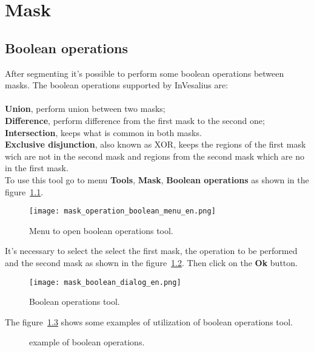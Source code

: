 \chapter{Mask}


\section{Boolean operations}

After segmenting it's possible to perform some boolean operations between masks. The boolean operations supported by InVesalius are:\\
\\
\textbf{Union}, perform union between two masks;\\
\textbf{Difference}, perform difference from the first mask to the second one;\\
\textbf{Intersection}, keeps what is common in both masks.\\
\textbf{Exclusive disjunction}, also known as XOR, keeps the regions of the first mask wich are not in the second mask and regions from the second mask which are no in the first mask.\\

To use this tool go to menu \textbf{Tools}, \textbf{Mask}, \textbf{Boolean operations} as shown in the figure~\ref{fig:booleano_menu}.

\begin{figure}[!htb]
\centering
\texttt{[image: mask\_operation\_boolean\_menu\_en.png]}
\caption{Menu to open boolean operations tool.}
\label{fig:booleano_menu}
\end{figure}

It's necessary to select the select the first mask, the operation to be performed and the second mask as shown in the figure~\ref{fig:booleano_janela}. Then click on the \textbf{Ok} button.

\begin{figure}[!htb]
\centering
\texttt{[image: mask\_boolean\_dialog\_en.png]}
\caption{Boolean operations tool.}
\label{fig:booleano_janela}
\end{figure}

The figure~\ref{fig:op_boolana} shows some examples of utilization of boolean operations tool.

\begin{figure}[!htb]
  \centering
  \hfill
  \hfill
  \hfill
  \hfill
  \hfill
  \caption{example of boolean operations.}
  \label{fig:op_boolana}
\end{figure}


